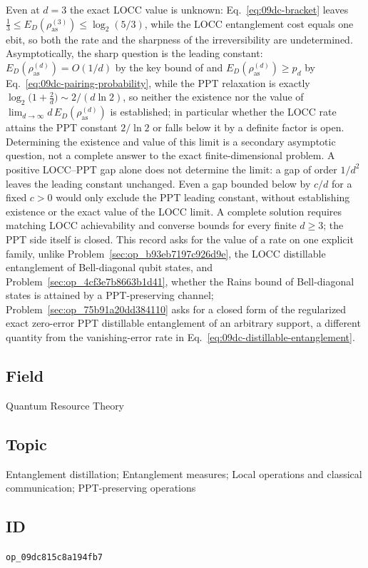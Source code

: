 Even at $d=3$ the exact LOCC value is unknown:
Eq.~\eqref{eq:09dc-bracket} leaves
$\tfrac13\le E_D(\rho_{\mathrm{as}}^{(3)})\le\log_2(5/3)$, while the LOCC
entanglement cost equals one ebit, so both the rate and the sharpness of
the irreversibility are undetermined.  Asymptotically, the sharp question
is the leading constant: $E_D(\rho_{\mathrm{as}}^{(d)})=O(1/d)$ by the key
bound of  and
$E_D(\rho_{\mathrm{as}}^{(d)})\ge p_d$ by
Eq.~\eqref{eq:09dc-pairing-probability}, while the PPT relaxation is
exactly $\log_2\bigl(1+\tfrac2d\bigr)\sim 2/(d\ln2)$, so neither the
existence nor the value of
$\lim_{d\to\infty}d\,E_D(\rho_{\mathrm{as}}^{(d)})$ is established; in
particular whether the LOCC rate attains the PPT constant $2/\ln2$ or
falls below it by a definite factor is open.  Determining the existence and value of this limit is a secondary
asymptotic question, not a complete answer to the exact finite-dimensional
problem.  A positive LOCC--PPT gap alone does not determine the limit: a
gap of order $1/d^2$ leaves the leading constant unchanged.  Even a gap
bounded below by $c/d$ for a fixed $c>0$ would only exclude the PPT leading
constant, without establishing existence or the exact value of the LOCC
limit.  A complete solution requires matching LOCC achievability and
converse bounds for every finite $d\ge3$; the PPT side itself is closed.  This record asks for the
value of a rate on one explicit family, unlike
Problem~\ref{sec:op_b93eb7197c926d9e}, the LOCC distillable entanglement
of Bell-diagonal qubit states, and
Problem~\ref{sec:op_4cf3e7b8663b1d41}, whether the Rains bound of
Bell-diagonal states is attained by a PPT-preserving channel;
Problem~\ref{sec:op_75b91a20dd384110} asks for a closed form of the
regularized exact zero-error PPT distillable entanglement of an arbitrary
support, a different quantity from the vanishing-error rate in
Eq.~\eqref{eq:09dc-distillable-entanglement}.

\subsection*{Field}

Quantum Resource Theory

\subsection*{Topic}

Entanglement distillation; Entanglement measures; Local operations and classical communication; PPT-preserving operations

\subsection*{ID}

\texttt{op\_09dc815c8a194fb7}
